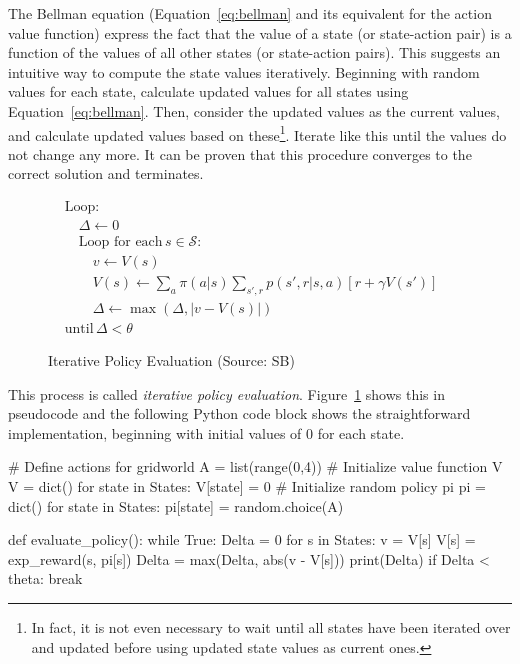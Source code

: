 The Bellman equation (Equation~\ref{eq:bellman} and its equivalent for the action value function) express the fact that the value of a state (or state-action pair) is a function of the values of all other states (or state-action pairs). This suggests an intuitive way to compute the state values iteratively. Beginning with random values for each state, calculate updated values for all states using Equation~\ref{eq:bellman}. Then, consider the updated values as the current values, and calculate updated values based on these\footnote{In fact, it is not even necessary to wait until all states have been iterated over and updated before using updated state values as current ones.}. Iterate like this until the values do not change any more. It can be proven that this procedure converges to the correct solution and terminates. 


\begin{figure}
\small
\begin{tcolorbox}[colback=code]
\vspace{-\baselineskip}
\begin{align*}
&\text{Loop:} \\
&\quad \Delta \leftarrow 0 \\
&\quad \text{Loop for each}\, s \in \mathcal{S}: \\
&\quad \quad v \leftarrow V(s) \\
&\quad \quad V(s) \leftarrow \sum\nolimits_a \pi(a|s) \sum\nolimits_{s', r} p(s', r|s, a)[r + \gamma V(s')] \hspace{1in} \\
&\quad \quad \Delta \leftarrow \max (\Delta, |v - V(s)|) \\
&\text{until}\, \Delta < \theta
\end{align*}
\end{tcolorbox}
\caption{Iterative Policy Evaluation (Source: SB)}
\label{fig:policyiteration}
\end{figure}

This process is called \emph{iterative policy evaluation}. Figure~\ref{fig:policyiteration} shows this in pseudocode and the following Python code block shows the straightforward implementation, beginning with initial values of $0$ for each state.

\begin{samepage}
\begin{pythoncode}
# Define actions for gridworld
A = list(range(0,4))
# Initialize value function V
V = dict()
for state in States:
    V[state] = 0
# Initialize random policy pi
pi = dict()
for state in States:
    pi[state] = random.choice(A)

def evaluate_policy():
    while True:
        Delta = 0
        for s in States:
            v = V[s]
            V[s] = exp_reward(s, pi[s])
            Delta = max(Delta, abs(v - V[s]))
        print(Delta)
        if Delta < theta:
            break
\end{pythoncode}
\end{samepage}


